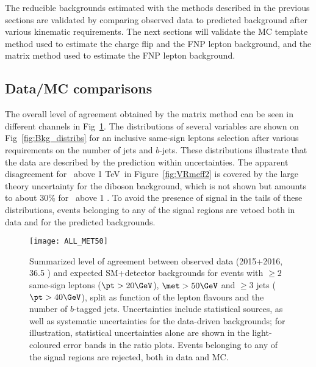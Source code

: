 The reducible backgrounds estimated with the methods described in the previous 
sections are validated by comparing observed data to 
predicted background after various kinematic requirements. 
The next sections will validate 
the MC template method used to estimate the charge flip and the FNP lepton 
background, and the matrix method used to estimate the FNP lepton background.



\subsection*{Data/MC comparisons}

The overall level of agreement obtained by the matrix method
can be seen in different channels in Fig~\ref{fig:distributions_summary}. 
The distributions of several variables are shown on Fig~\ref{fig:Bkg_distribs} for an inclusive same-sign leptons selection
after various requirements on the number of jets and $b$-jets.
These distributions illustrate that the data are described by the prediction 
within uncertainties. 
The apparent disagreement 
for \meff\ above 1 TeV~in Figure~\ref{fig:VRmeff2} is covered by the large 
theory uncertainty for the diboson background, which is not shown 
but amounts to about 30\% for \meff\ above 1 \TeV. 
To avoid the presence of signal in the tails of these distributions, 
events belonging to any of the signal regions are vetoed 
both in data and for the predicted backgrounds. 

\begin{figure}[t!]
\centering
\texttt{[image: ALL\_MET50]}
\caption{Summarized level of agreement between observed data (2015+2016, 36.5 \ifb) and expected SM+detector backgrounds 
for events with $\ge 2$ same-sign leptons ($\pt>20 \GeV$), $\met>50 \GeV$ and $\ge 3$ jets ($\pt>40 \GeV$), 
split as function of the lepton flavours and the number of $b$-tagged jets. 
Uncertainties include statistical sources, as well as systematic uncertainties for the data-driven backgrounds; 
for illustration, statistical uncertainties alone are shown in the light-coloured error bands in the ratio plots. 
Events belonging to any of the signal regions are rejected, both in data and MC. 
}
\label{fig:distributions_summary}
\end{figure} 

